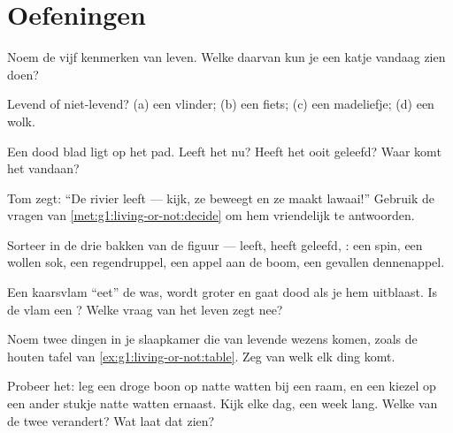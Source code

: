 \section{Oefeningen}

\begin{exercise}[$\star$]\label{exo:g1:living-or-not:1}
Noem de vijf kenmerken van leven. Welke daarvan kun je een katje
vandaag zien doen?
\end{exercise}

\begin{exercise}[$\star$]\label{exo:g1:living-or-not:2}
Levend of niet-levend? (a) een vlinder; (b) een fiets; (c) een
madeliefje; (d) een wolk.
\end{exercise}

\begin{exercise}[$\star$]\label{exo:g1:living-or-not:3}
Een dood blad ligt op het pad. Leeft het nu? Heeft het ooit geleefd?
Waar komt het vandaan?
\end{exercise}

\begin{exercise}[$\star$]\label{exo:g1:living-or-not:4}
Tom zegt: ``De rivier leeft --- kijk, ze beweegt en ze maakt
lawaai!'' Gebruik de vragen van \cref{met:g1:living-or-not:decide} om
hem vriendelijk te antwoorden.
\end{exercise}

\begin{exercise}[$\star$]\label{exo:g1:living-or-not:5}
Sorteer in de drie bakken van de figuur --- leeft, heeft geleefd,
: een spin, een wollen sok, een regendruppel, een appel
aan de boom, een gevallen dennenappel.
\end{exercise}

\begin{exercise}[$\star$]\label{exo:g1:living-or-not:6}
Een kaarsvlam ``eet'' de was, wordt groter en gaat dood als je hem
uitblaast. Is de vlam een ? Welke vraag van het leven zegt
nee?
\end{exercise}

\begin{exercise}[$\star$]\label{exo:g1:living-or-not:7}
Noem twee dingen in je slaapkamer die van levende wezens komen, zoals
de houten tafel van \cref{ex:g1:living-or-not:table}. Zeg van welk
 elk ding komt.
\end{exercise}

\begin{exercise}[$\star$]\label{exo:g1:living-or-not:8}
Probeer het: leg een droge boon op natte watten bij een raam, en een
kiezel op een ander stukje natte watten ernaast. Kijk elke dag, een
week lang. Welke van de twee verandert? Wat laat dat zien?
\end{exercise}

